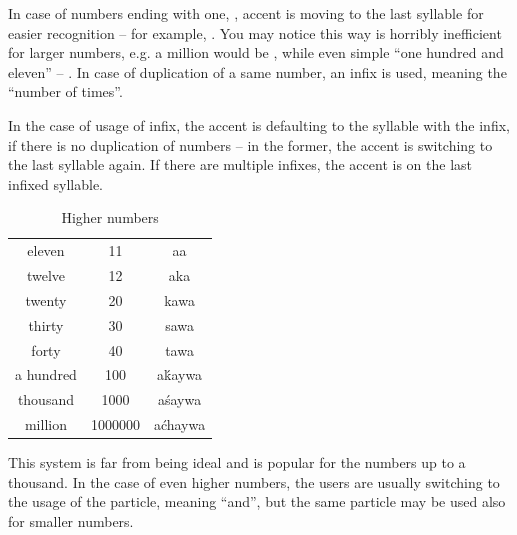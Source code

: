 In case of numbers ending with one, , accent is moving to the last
syllable for easier recognition -- for example, . You may notice
this way is horribly inefficient for larger numbers, e.g. a million would be
, while even simple ``one hundred and eleven'' --
. In case of duplication of a same number, an  infix is
used, meaning the ``number of times''.


In the case of usage of  infix, the accent is defaulting to the syllable
with the infix, if there is no duplication of numbers -- in the former, the
accent is switching to the last syllable again. If there are multiple 
infixes, the accent is on the last infixed syllable.

\begin{table}[ht]
    \centering
    \caption{Higher numbers}
    \begin{tabular}{ccc} \toprule
        eleven    & 11      & aa      \\
        twelve    & 12      & aka     \\
        twenty    & 20      & kawa    \\
        thirty    & 30      & sawa    \\
        forty     & 40      & tawa    \\
        a hundred & 100     & aḱaywa  \\
        thousand  & 1000    & aśaywa  \\
        million   & 1000000 & aćhaywa \\\bottomrule
    \end{tabular}
    \label{tab:numerals2}
\end{table}

This system is far from being ideal and is popular for the numbers up to a
thousand. In the case of even higher numbers, the users are usually switching to
the usage of the  particle, meaning ``and'', but the same particle
may be used also for smaller numbers.



